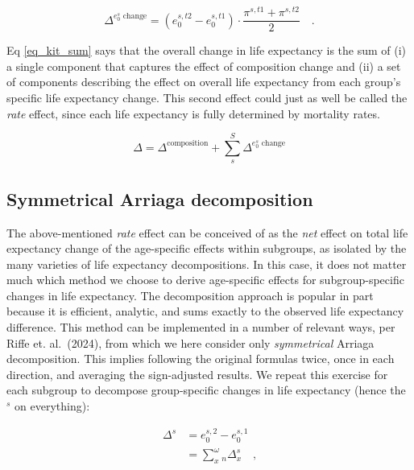 \documentclass[sn-apa,pdflatex]{sn-jnl}
\theoremstyle{remark}
\theoremstyle{definition}
\begin{document}
\begin{equation}
\label{eq_kit_e0}
\Delta^{e_0^s\text{~change}} = \left(e_0^{s,t2} - e_0^{s,t1}\right) \cdot \frac{\pi^{s,t1} + \pi^{s,t2}}{2}\quad \textrm{.}
\end{equation}

Eq \eqref{eq_kit_sum} says that the overall change in life expectancy is
the sum of (i) a single component that captures the effect of
composition change and (ii) a set of components describing the effect on
overall life expectancy from each group's specific life expectancy
change. This second effect could just as well be called the \emph{rate}
effect, since each life expectancy is fully determined by mortality
rates.

\begin{equation}
\label{eq_kit_sum}
\Delta = \Delta^\text{composition}  + \sum_s^S \Delta^{e_0^s\text{~change}}
\end{equation}

\hypertarget{symmetrical-arriaga-decomposition}{%
\subsection{Symmetrical Arriaga
decomposition}\label{symmetrical-arriaga-decomposition}}

The above-mentioned \emph{rate} effect can be conceived of as the
\emph{net} effect on total life expectancy change of the age-specific
effects within subgroups, as isolated by the many varieties of life
expectancy decompositions. In this case, it does not matter much which
method we choose to derive age-specific effects for subgroup-specific
changes in life expectancy. The \citet{arriaga1984measuring}
decomposition approach is popular in part because it is efficient,
analytic, and sums exactly to the observed life expectancy difference.
This method can be implemented in a number of relevant ways, per Riffe
et. al.~(2024), from which we here consider only \emph{symmetrical}
Arriaga decomposition. This implies following the original formulas
twice, once in each direction, and averaging the sign-adjusted results.
We repeat this exercise for each subgroup to decompose group-specific
changes in life expectancy (hence the \(^s\) on everything):

\begin{align}
\label{eq_kit_e0}
\Delta^s &= e_0^{s,2} - e_0^{s,1}  \\
 &= \sum _x^\omega {}_n\Delta_x^s \quad \textrm{,}\nonumber 
\end{align}
\end{document}
